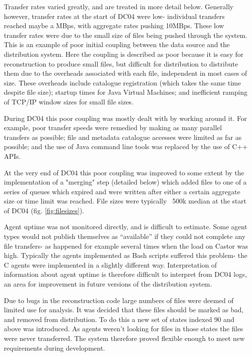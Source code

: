 \documentclass{cmspaper}
\begin{document}
Transfer rates varied greatly, and are treated in more detail
below. Generally however, transfer rates at the start of DC04 were
low- individual transfers reached maybe a MBps, with aggregate rates
pushing 10MBps. These low transfer rates were due to the small size of
files being pushed through the system. This is an example of poor
initial coupling between the data source and the distribution
system. Here the coupling is described as poor because it is easy for
reconstruction to produce small files, but difficult for distribution
to distribute them due to the overheads associated with each file,
independent in most cases of size. These overheads include catalogue
registration (which takes the same time despite file size); startup
times for Java Virtual Machines; and inefficient ramping of TCP/IP
window sizes for small file sizes.

During DC04 this poor coupling was mostly dealt with by working around
it. For example, poor transfer speeds were remedied by making as many
parallel transfers as possible; file and metadata catalogue accesses
were limited as far as possible; and the use of Java command line
tools was replaced by the use of C++ APIs.

At the very end of DC04 this poor coupling was improved to some extent
by the implementation of a "merging" step (detailed below) which added
files to one of a series of queues which expired and were written
after either a certain aggregate size or time limit was reached. File
sizes were typically ~500k median at the start of DC04
(fig. \ref{fig:filesizes}).

Agent uptime was not monitored directly, and is difficult to
estimate. Some agent types would not publish themselves as
``available'' if they could not complete any file transfers- as
happened for example several times when the load on Castor was
high. Typically the agents implemented as Bash scripts suffered this
problem- the C agents were implemented in a slightly different way.
Interpretation of information about agent uptime is therefore
difficult to interpret from DC04 logs, an area for improvement in
future versions of the distribution system.

Due to bugs in the reconstruction code large numbers of files were
deemed of limited use for analysis. It was decided that these files
should be marked as bad, and removed from distribution. To do this a
new set of states indexed 90 and above was introduced. As agents
weren't looking for files in those states the files were never
transferred. The system therefore proved flexible enough to meet new
requirements during development.
\end{document}
